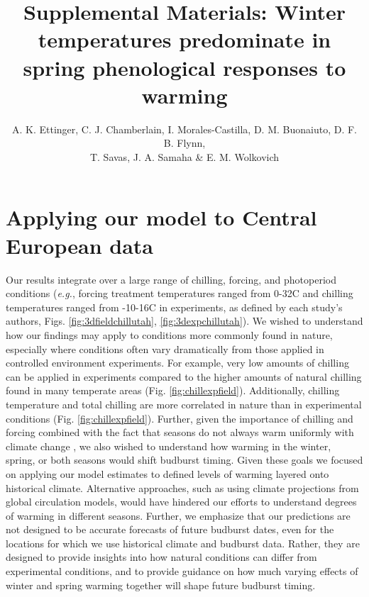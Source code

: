 \documentclass{article}
\begin{document}

\title{Supplemental Materials:  Winter temperatures predominate in spring phenological responses to warming} 

\author{A. K. Ettinger, C. J. Chamberlain, I. Morales-Castilla, D. M. Buonaiuto, D. F. B. Flynn, \\ T. Savas, J. A. Samaha \& E. M. Wolkovich}
\date{} 
\maketitle  
\renewcommand{\thetable}{S\arabic{table}}
\renewcommand{\thefigure}{S\arabic{figure}}

\section*{Applying our model to Central European data}

Our results integrate over a large range of chilling, forcing, and photoperiod conditions (\emph{e.g.}, forcing treatment temperatures ranged from 0-32\degree C and chilling temperatures ranged from -10-16\degree C in experiments, as defined by each study's authors, Figs. \ref{fig:3dfieldchillutah}, \ref{fig:3dexpchillutah}). We wished to understand how our findings may apply to conditions more commonly found in nature, especially where conditions often vary dramatically from those applied in controlled environment experiments. For example, very low amounts of chilling can be applied in experiments compared to the higher amounts of natural chilling found in many temperate areas (Fig. \ref{fig:chillexpfield}). Additionally, chilling temperature and total chilling are more correlated in nature than in experimental conditions (Fig. \ref{fig:chillexpfield}). Further, given the importance of chilling and forcing combined with the fact that seasons do not always warm uniformly with climate change \emph{\citep{vautard2014,eea2019}}, we also wished to understand how warming in the winter, spring, or both seasons would shift budburst timing. Given these goals we focused on applying our model estimates to defined levels of warming layered onto historical climate. Alternative approaches, such as using climate projections from global circulation models, would have hindered our efforts to understand degrees of warming in different seasons. Further, we emphasize that our predictions are not designed to be accurate forecasts of future budburst dates, even for the locations for which we use historical climate and budburst data. Rather, they are designed to provide insights into how natural conditions can differ from experimental conditions, and to provide guidance on how much varying effects of winter and spring warming together will shape future budburst timing.
\end{document}

